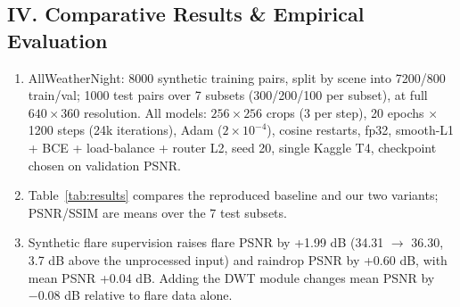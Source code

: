 \documentclass[8pt,a4paper]{article}
\begin{document}
\subsection*{IV. Comparative Results \& Empirical Evaluation}
\begin{enumerate}
    \item AllWeatherNight: 8000 synthetic training pairs, split by scene into 7200/800 train/val; 1000 test pairs over 7 subsets (300/200/100 per subset), at full $640\times360$ resolution. All models: $256\times256$ crops (3 per step), 20 epochs $\times$ 1200 steps (24k iterations), Adam ($2\times10^{-4}$), cosine restarts, fp32, smooth-L1 + BCE + load-balance + router L2, seed 20, single Kaggle T4, checkpoint chosen on validation PSNR.
    \item Table~\ref{tab:results} compares the reproduced baseline and our two variants; PSNR/SSIM are means over the 7 test subsets.
    \item Synthetic flare supervision raises flare PSNR by +1.99 dB (34.31 $\rightarrow$ 36.30, 3.7 dB above the unprocessed input) and raindrop PSNR by +0.60 dB, with mean PSNR +0.04 dB. Adding the DWT module changes mean PSNR by $-0.08$ dB relative to flare data alone.
\end{enumerate}
\end{document}

